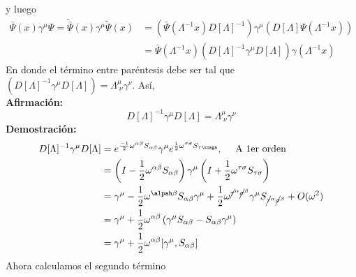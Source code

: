 \documentclass[../main.tex]{subfiles}
\begin{document}
y luego
\begin{align*}
  \bar{\Psi}(x)\gamma^\mu \Psi = \tilde{\bar{\Psi}} (x)\gamma^\mu \tilde{\Psi}(x) & = \left( \bar{\Psi}(\Lambda^{-1}x) D[\Lambda]^{-1} \right) \gamma^\mu \left( D[\Lambda]\Psi(\Lambda^{-1}x) \right) \\
  & = \bar{\Psi}(\Lambda^{-1}x) \left( D[\Lambda]^{-1} \gamma^\mu D[\Lambda] \right) \gamma(\Lambda^{-1}x)
\end{align*}
En donde el término entre paréntesis debe ser tal que $ \left( D[\Lambda]^{-1}\gamma^\mu D[\Lambda] \right)  = \Lambda^\mu_{\;\nu}\gamma^\nu$. Así, \\
\textbf{Afirmación:} 
\begin{equation*}
  D[\Lambda]^{-1} \gamma^\mu D[\Lambda] = \Lambda^\mu_{\; \nu} \gamma^\nu 
\end{equation*}
\textbf{Demostración:} 
\begin{align*}
  D[\Lambda]^{-1} \gamma^\mu D[\Lambda ] & = e^{\frac{-1}{2}\omega^{\alpha \beta}S_{\alpha \beta}} \gamma^\mu e^{\frac{1}{2}\omega^{\tau \sigma}S_{\tau \simga}} , \quad \text{ A 1er orden } \\
  & = \left( I - \frac{1}{2}\omega^{\alpha \beta} S_{\alpha \beta} \right) \gamma^\mu \left( I + \frac{1}{2}\omega^{\tau \sigma} S_{\tau \sigma} \right) \\ 
  & = \gamma^\mu - \frac{1}{2}\omega^{\alpah \beta} S_{\alpha \beta} \gamma^\mu + \frac{1}{2}\omega^{\cancel{\tau}^\alpha \cancel{\sigma}^\beta} \gamma^\mu S_{\cancel{\tau}^\alpha\cancel{\sigma}^\beta} + O(\omega^2) \\
  & = \gamma^\mu + \frac{1}{2}\omega^{\alpha \beta} \left( \gamma^\mu S_{\alpha \beta} - S_{\alpha \beta} \gamma^\mu \right) \\
  & = \gamma^\mu + \frac{1}{2}\omega^{\alpha \beta} [\gamma^\mu , S_{\alpha \beta}]
\end{align*}
Ahora calculamos el segundo término
\end{document}
